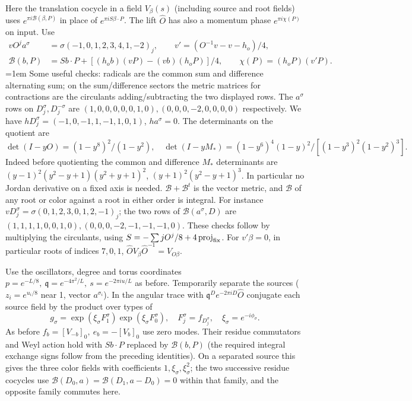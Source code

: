 Here the translation cocycle in a field \(V_\beta(s)\) (including source and root fields) uses \(e^{\pi i \mathcal B(\beta,P)}\) in place of \(e^{\pi i S\beta\cdot P}\). The lift \(\widehat O\) has also a momentum phase \(e^{\pi i\chi(P)}\) on input. Use
\[
\begin{aligned}
 v O^j a^\sigma &=\sigma(-1,0,1,2,3,4,1,-2)_j,\qquad v'=(O^{-1}v-v-h_o)/4,\\
 \mathcal B(b,P)&=S b\cdot P+[(h_o b)(vP)-(vb)(h_o P)]/4,\qquad
 \chi(P)=(h_oP)(v' P).
\end{aligned}
\]
\begingroup\emergencystretch=1em
Some useful checks: radicals are the common sum and difference alternating sum; on the sum/difference sectors the metric matrices for contractions are the circulants adding/subtracting the two displayed rows. The \(a^\sigma\) rows on \(D_j^\sigma,D_j^{-\sigma}\) are \((1,0,0,0,0,0,1,0),(0,0,0,-2,0,0,0,0)\) respectively. We have \(hD_j^\sigma=(-1,0,-1,1,-1,1,0,1)\), \(ha^\sigma=0\). The determinants on the quotient are
\[
 \det(I-yO)=(1-y^8)^2/(1-y^2),\quad
 \det(I-yM_*)=(1-y^6)^4(1-y)^2/[(1-y^3)^2(1-y^2)^3].
\]
Indeed before quotienting the common and difference \(M_*\) determinants are \((y-1)^2(y^2-y+1)(y^2+y+1)^2\), \((y+1)^2(y^2-y+1)^3\). In particular no Jordan derivative on a fixed axis is needed. \(\mathcal B+\mathcal B^t\) is the vector metric, and \(\mathcal B\) of any root or color against a root in either order is integral. For instance \(vD_j^\sigma=\sigma(0,1,2,3,0,1,2,-1)_j\); the two rows of \(\mathcal B(a^\sigma,D)\) are \((1,1,1,1,0,0,1,0),(0,0,0,-2,-1,-1,-1,0)\). These checks follow by multiplying the circulants, using \(S=-\sum jO^j/8+4\,{\rm proj}_{\rm fix}\). For \(v'\beta=0\), in particular roots of indices \(7,0,1\), \(\widehat O V_\beta\widehat O^{-1}=V_{O\beta}\).
\par\endgroup

Use the oscillators, degree and torus coordinates \(p=e^{-L/8},\ \mathfrak q=e^{-4\pi^2/L},\ s=e^{-2\pi i u/L}\) as before. Temporarily separate the sources (\(z_i=e^{u_i/8}\) near 1, vector \(a^{\sigma_i}\)). In the angular trace with \(\mathfrak q^D e^{-2\pi iD}\widehat O\) conjugate each source field by the product over types of
\[
 g_\sigma=\exp(\xi_\sigma F_1^\sigma)\exp(\xi_\sigma F_0^\sigma),
 \quad F_j^\sigma=f_{D_j^\sigma},\quad \xi_\sigma=e^{-i\phi_\sigma}.
\]
As before \(f_b=[V_{-b}]_0,\ e_b=-[V_b]_0\) use zero modes. Their residue commutators and Weyl action hold with \(S b\cdot P\) replaced by \(\mathcal B(b,P)\) (the required integral exchange signs follow from the preceding identities). On a separated source this gives the three color fields with coefficients \(1,\xi_\sigma,\xi_\sigma^2\); the two successive residue cocycles use \(\mathcal B(D_0,a)=\mathcal B(D_1,a-D_0)=0\) within that family, and the opposite family commutes here.

